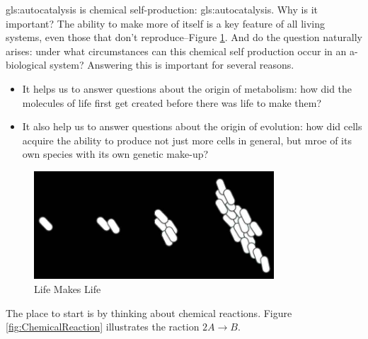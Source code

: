 \documentclass[]{article}
\begin{document}
\Gls{gls:autocatalysis} is chemical self-production: \glsdesc{gls:autocatalysis}. Why is it important? The ability to make more of itself is a key feature of all living systems, even those that don't reproduce--Figure \ref{fig:LifeMakesLife}. And do the question naturally arises: under what circumstances can this chemical self production occur in an a-biological system? Answering this is important for several reasons.\begin{itemize}
	\item  It helps us to answer questions about the origin of metabolism: how did the molecules of life first get created before there was life to make them?
	\item It also help us to answer questions about the origin of evolution: how did cells acquire the ability to produce not just more cells in general, but mroe of its own species with its own genetic make-up?
\end{itemize}
\begin{figure}[H]
	\begin{center}
		\caption{Life Makes Life}\label{fig:LifeMakesLife}
		\includegraphics[width=0.8\textwidth]{LifeMakesLife}
	\end{center}
\end{figure}

The place to start is by thinking about chemical reactions. Figure \ref {fig:ChemicalReaction} illustrates the raction $2A \rightarrow B$.
\end{document}
